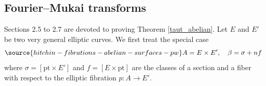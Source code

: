 \subsection{Fourier--Mukai transforms}\label{Sec2.5} Sections 2.5 to 2.7 are devoted to proving Theorem \ref{taut_abelian}. Let $E$ and $E'$ be two very general elliptic curves. We first treat the special case
\begin{equation}\label{special}
\source{hitchin-fibrations-abelian-surfaces-pw}
A= E \times E', \quad \beta = \sigma + nf
\end{equation}
where $\sigma = [\mathrm{pt} \times E']$ and $f = [E \times \mathrm{pt}]$ are the classes of a section and a fiber with respect to the elliptic fibration $p: A \to E'$.

